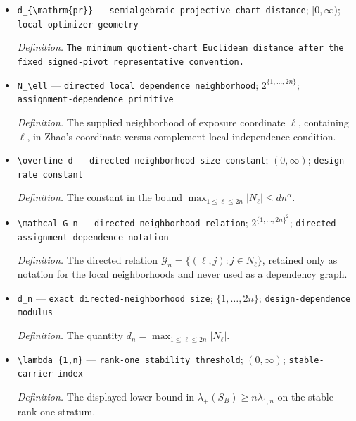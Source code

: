 \documentclass{article}
\begin{document}
\begin{itemize}
  \item \texttt{d\_\allowbreak{}\{\textbackslash{}\allowbreak{}mathrm\{pr\}\allowbreak{}\}\allowbreak{}} --- \texttt{semialgebraic projective-\allowbreak{}chart distance}; \([0,\infty)\); \texttt{local optimizer geometry}
  \par\smallskip\noindent\emph{Definition.} \texttt{The minimum quotient-\allowbreak{}chart Euclidean distance after the fixed signed-\allowbreak{}pivot representative convention.}
  \item \texttt{N\_\allowbreak{}\textbackslash{}\allowbreak{}ell} --- \texttt{directed local dependence neighborhood}; \(2^{\{1,\ldots,2n\}}\); \texttt{assignment-\allowbreak{}dependence primitive}
  \par\smallskip\noindent\emph{Definition.} The supplied neighborhood of exposure coordinate \(\ell\), containing \(\ell\), in Zhao's coordinate-versus-complement local independence condition.
  \item \texttt{\textbackslash{}\allowbreak{}overline d} --- \texttt{directed-\allowbreak{}neighborhood-\allowbreak{}size constant}; \((0,\infty)\); \texttt{design-\allowbreak{}rate constant}
  \par\smallskip\noindent\emph{Definition.} The constant in the bound \(\max_{1\le \ell\le 2n}|N_\ell|\le\overline d n^{\alpha}\).
  \item \texttt{\textbackslash{}\allowbreak{}mathcal G\_\allowbreak{}n} --- \texttt{directed neighborhood relation}; \(2^{\{1,\ldots,2n\}^2}\); \texttt{directed assignment-\allowbreak{}dependence notation}
  \par\smallskip\noindent\emph{Definition.} The directed relation \(\mathcal G_n=\{(\ell,j):j\in N_\ell\}\), retained only as notation for the local neighborhoods and never used as a dependency graph.
  \item \texttt{d\_\allowbreak{}n} --- \texttt{exact directed-\allowbreak{}neighborhood size}; \(\{1,\ldots,2n\}\); \texttt{design-\allowbreak{}dependence modulus}
  \par\smallskip\noindent\emph{Definition.} The quantity \(d_n=\max_{1\le\ell\le2n}|N_\ell|\).
  \item \texttt{\textbackslash{}\allowbreak{}lambda\_\allowbreak{}\{1,\allowbreak{}n\}\allowbreak{}} --- \texttt{rank-\allowbreak{}one stability threshold}; \((0,\infty)\); \texttt{stable-\allowbreak{}carrier index}
  \par\smallskip\noindent\emph{Definition.} The displayed lower bound in \(\lambda_+(S_B)\ge n\lambda_{1,n}\) on the stable rank-one stratum.

\end{itemize}
\end{document}
